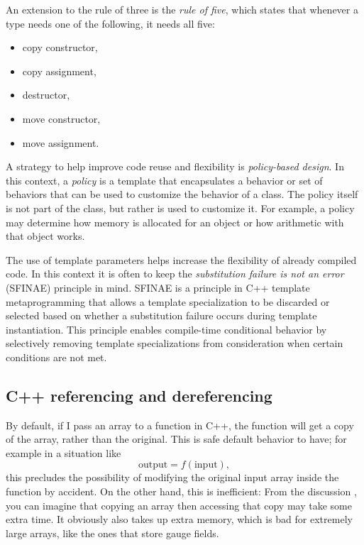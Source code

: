 An extension to the rule of three is the {\it rule of five},
which states that whenever a type needs one of the
following, it needs all five: 
\begin{itemize}
  \item copy constructor,
  \item copy assignment,
  \item destructor,
  \item move constructor,
  \item move assignment. 
\end{itemize}

A strategy to help improve code reuse and flexibility is {\it policy-based design}.
In this context, a {\it policy} is a template that encapsulates a 
behavior or set of behaviors that can be used to customize the behavior of a class. 
The policy itself is not part of the class, but rather is used to customize it. 
For example, a policy may determine how memory is allocated for an object
or how arithmetic with that object works.

The use of template parameters helps increase the flexibility of already
compiled code. In this context it is often to keep the
{\it substitution failure is not an error} (SFINAE) principle
in mind.
SFINAE is a principle in C++ template metaprogramming that allows a template 
specialization to be discarded or selected based on whether a substitution 
failure occurs during template instantiation. This principle enables compile-time 
conditional behavior by selectively removing template specializations from 
consideration when certain conditions are not met.

\subsection{C++ referencing and dereferencing}

By default, if I pass an array to a function in C++, the function will get a
copy of the array, rather than the original. This is safe default behavior to
have; for example in a situation like
\begin{equation}
\text{output}=f(\text{input}),
\end{equation}
this precludes the possibility of modifying the original input array inside the
function by accident. On the other hand, this is inefficient: From the
discussion , you can imagine that copying an array then
accessing that copy may take some extra time. It obviously also takes up extra
memory, which is bad for extremely large arrays, like the ones that store gauge
fields.

